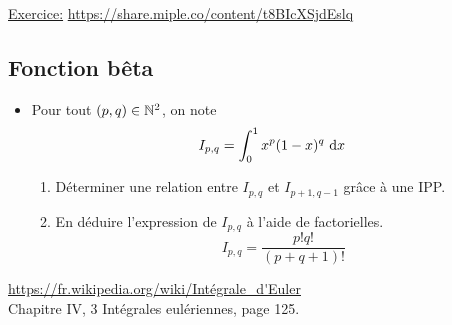 \underline{Exercice:} \url{https://share.miple.co/content/t8BIcXSjdEslq}

\subsection{Fonction bêta}
\begin{itemize}
    \item Pour tout $(p,q) \in \mathbb{N}^2$, on note 
    $$I_{p,q} = \int_{0}^{1} x^p (1-x)^q\ \mathrm{d} x$$
    \begin{enumerate}
        \item Déterminer une relation entre $I_{p,q}$ et $I_{p+1, q-1}$ grâce à une IPP.
        \item En déduire l'expression de $I_{p,q}$ à l'aide de factorielles.
        $$\boxed{I_{p,q} = \frac{p! q!}{(p + q + 1)!}}$$
    \end{enumerate}
\end{itemize}
\url{https://fr.wikipedia.org/wiki/Intégrale_d'Euler} \\
\cite{calcul_infinitesimal} Chapitre IV, 3 Intégrales eulériennes, page 125.
